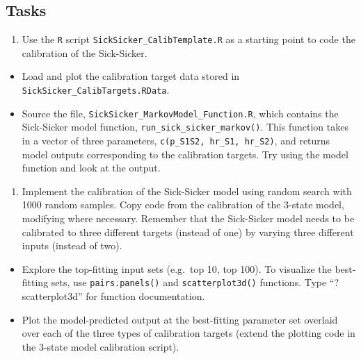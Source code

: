 \documentclass[
]{article}
\providecommand{\tightlist}{%
  \setlength{\itemsep}{0pt}\setlength{\parskip}{0pt}}
\begin{document}
\hypertarget{tasks}{%
\subsection{Tasks}\label{tasks}}

\begin{enumerate}
\def\labelenumi{\arabic{enumi}.}
\tightlist
\item
  Use the \texttt{R} script \texttt{SickSicker\_CalibTemplate.R} as a
  starting point to code the calibration of the Sick-Sicker.
\end{enumerate}

\begin{itemize}
\item
  Load and plot the calibration target data stored in
  \texttt{SickSicker\_CalibTargets.RData}.
\item
  Source the file, \texttt{SickSicker\_MarkovModel\_Function.R}, which
  contains the Sick-Sicker model function,
  \texttt{run\_sick\_sicker\_markov()}. This function takes in a vector
  of three parameters, \texttt{c(p\_S1S2,\ hr\_S1,\ hr\_S2)}, and
  returns model outputs corresponding to the calibration targets. Try
  using the model function and look at the output.
\end{itemize}

\begin{enumerate}
\def\labelenumi{\arabic{enumi}.}
\setcounter{enumi}{1}
\tightlist
\item
  Implement the calibration of the Sick-Sicker model using random search
  with 1000 random samples. Copy code from the calibration of the
  3-state model, modifying where necessary. Remember that the
  Sick-Sicker model needs to be calibrated to three different targets
  (instead of one) by varying three different inputs (instead of two).
\end{enumerate}

\begin{itemize}
\item
  Explore the top-fitting input sets (e.g.~top 10, top 100). To
  visualize the best-fitting sets, use \texttt{pairs.panels()} and
  \texttt{scatterplot3d()} functions. Type ``?scatterplot3d'' for
  function documentation.
\item
  Plot the model-predicted output at the best-fitting parameter set
  overlaid over each of the three types of calibration targets (extend
  the plotting code in the 3-state model calibration script).
\end{itemize}
\end{document}
